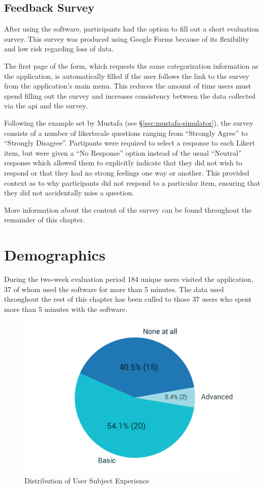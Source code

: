 \documentclass[bsc,twoside,singlespacing,parskip,logo,notimes,normalheadings]{infthesis}
\begin{document}
        \subsection{Feedback Survey}
        After using the software, participants had the option to fill
        out a short evaluation survey. This survey was produced using
        Google Forms\cite{googleforms} because of its flexibility and
        low risk regarding loss of data.

        The first page of the form, which requests the same
        categorization information as the application, is
        automatically filled if the user follows the link to the
        survey from the application's main menu. This reduces the
        amount of time users must spend filling out the survey and
        increases consistency between the data collected via the
        \gls{api} and the survey.

        Following the example set by Mustafa\cite{mustafa2010} (see
        \S\ref{sec:mustafa-simulator}), the survey consists of a
        number of \gls{likertscale} questions ranging from ``Strongly
        Agree'' to ``Strongly Disagree''. Partipants were required to
        select a response to each Likert item, but were given a ``No
        Response'' option instead of the usual ``Neutral'' response
        which allowed them to explicitly indicate that they did not
        wish to respond or that they had no strong feelings one way or
        another. This provided context as to why participants did not
        respond to a particular item, ensuring that they did not
        accidentally miss a question.

        More information about the content of the survey can be found
        throughout the remainder of this chapter.

    \section{Demographics}\label{sec:demographics}
    
    During the two-week evaluation period 184 unique users visited the
    application, 37 of whom used the software for more than 5
    minutes. The data used throughout the rest of this chapter has
    been culled to those 37 users who spent more than 5 minutes with
    the software.

    \begin{figure}
      \vspace{-12mm}
        \includegraphics[width=.40\textwidth, trim=150 0 100 0]{img/experience_pie.pdf}
        \captionsetup{width=.38\textwidth, justification=centering}
        \caption{Distribution of User Subject Experience}\label{fig:demo-q1}
    \end{figure}
\end{document}
